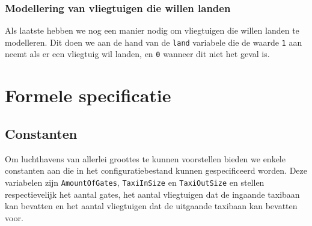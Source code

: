 \subsubsection{Modellering van vliegtuigen die willen landen}
Als laatste hebben we nog een manier nodig om vliegtuigen die willen landen te modelleren. Dit doen we aan de hand van de \texttt{land} variabele die de waarde \texttt{1} aan neemt als er een vliegtuig wil landen, en \texttt{0} wanneer dit niet het geval is. 

\section{Formele specificatie}
\subsection{Constanten}
Om luchthavens van allerlei groottes te kunnen voorstellen bieden we enkele constanten aan die in het configuratiebestand kunnen gespecificeerd worden. Deze variabelen zijn \texttt{AmountOfGates}, \texttt{TaxiInSize} en \texttt{TaxiOutSize} en stellen respectievelijk het aantal gates, het aantal vliegtuigen dat de ingaande taxibaan kan bevatten en het aantal vliegtuigen dat de uitgaande taxibaan kan bevatten voor.

